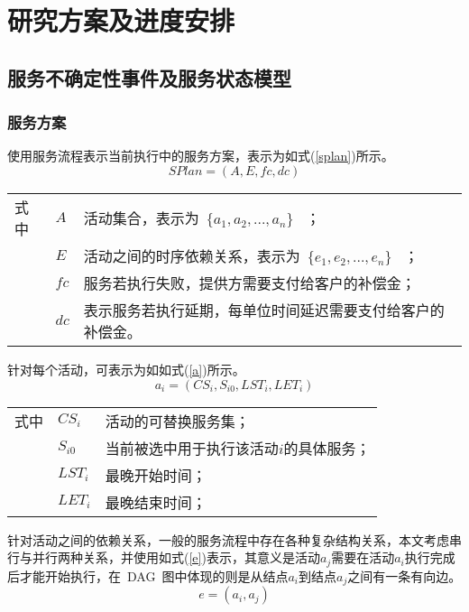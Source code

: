 \section{研究方案及进度安排}

\subsection{服务不确定性事件及服务状态模型}

\subsubsection{服务方案}

使用服务流程表示当前执行中的服务方案，表示为如式(\ref{splan})所示。
\begin{equation}\label{splan}
SPlan = \left( {A,E,fc,dc} \right)
\end{equation}
\begin{tabularx}{\textwidth}{@{}l@{\quad}l@{\pozhehao }X@{}}
    式中
    & ${A}$ & 活动集合，表示为~$\{{a_1}, {a_2},...,{a_n}\}$ ~； \\
    & ${E}$ & 活动之间的时序依赖关系，表示为~$\{{e_1}, {e_2},...,{e_n}\}$ ~；\\
    & ${fc}$ & 服务若执行失败，提供方需要支付给客户的补偿金；\\
    & ${dc}$ & 表示服务若执行延期，每单位时间延迟需要支付给客户的补偿金。
\end{tabularx}\vspace{\wordsep}

针对每个活动，可表示为如如式(\ref{a})所示。
\begin{equation}\label{a}
{a_i} = ({CS_i}, {S_{i0}}, {LST_i}, {LET_i})
\end{equation}
\begin{tabularx}{\textwidth}{@{}l@{\quad}l@{\pozhehao }X@{}}
    式中
    & ${CS_i}$ & 活动的可替换服务集；\\
    & ${S_{i0}}$ & 当前被选中用于执行该活动$i$的具体服务；\\
    & ${LST_i}$ & 最晚开始时间；\\
    & ${LET_i}$ & 最晚结束时间；
\end{tabularx}\vspace{\wordsep}

针对活动之间的依赖关系，一般的服务流程中存在各种复杂结构关系，本文考虑串行与并行两种关系，并使用如式(\ref{e})表示，其意义是活动${a_j}$需要在活动${a_i}$执行完成后才能开始执行，在~DAG~图中体现的则是从结点${a_i}$到结点${a_j}$之间有一条有向边。
\begin{equation}\label{e}
e = ({a_i},{a_j})
\end{equation}

